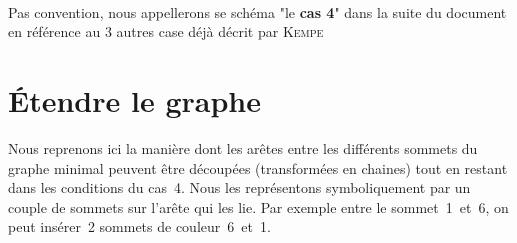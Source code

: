 \documentclass[french]{report}
\begin{document}
\\
Pas convention, nous appellerons se schéma "le \textbf{cas 4}" dans la suite du document en référence au 3 autres case déjà décrit par \textsc{Kempe}\\
\FloatBarrier

%
%

\section{Étendre le graphe}
Nous reprenons ici la manière dont les arêtes entre les différents sommets du graphe minimal peuvent être découpées (transformées en chaines) tout en restant dans les conditions du cas~4. Nous les représentons symboliquement par un couple de sommets sur l’arête qui les lie. Par exemple entre le sommet~1~et~6, on peut insérer~2 sommets de couleur~6~et~1. 
\end{document}
